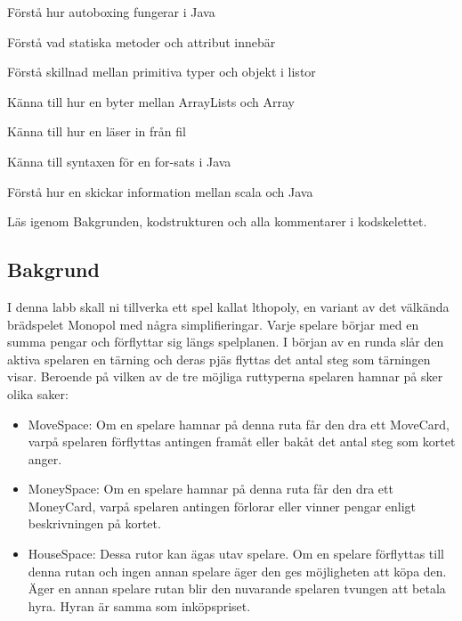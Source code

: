 

\Teamlab{\LabWeekTWELVE}

\begin{Goals}
\item Förstå hur autoboxing fungerar i Java
\item Förstå vad statiska metoder och attribut innebär
\item Förstå skillnad mellan primitiva typer och objekt i listor
\item Känna till hur en byter mellan ArrayLists och Array
\item Känna till hur en läser in från fil
\item Känna till syntaxen för en for-sats  i Java
\item Förstå hur en skickar information mellan scala och Java
\end{Goals}

\begin{Preparations}
\item {}
\item Läs igenom Bakgrunden, kodstrukturen och alla kommentarer i kodskelettet.

\end{Preparations}

\subsection{Bakgrund}
I denna labb skall ni tillverka ett spel kallat lthopoly, en variant av det välkända brädspelet Monopol med några simplifieringar. Varje spelare börjar med en summa pengar och förflyttar sig längs spelplanen.
I början av en runda slår den aktiva spelaren en tärning och deras pjäs flyttas det antal steg som tärningen visar. 
Beroende på vilken av de tre möjliga ruttyperna spelaren hamnar på sker olika saker:

\begin{itemize}
\item MoveSpace: Om en spelare hamnar på denna ruta får den dra ett MoveCard, varpå spelaren förflyttas antingen framåt eller bakåt det antal steg som kortet anger.
\item MoneySpace: Om en spelare hamnar på denna ruta får den dra ett MoneyCard, varpå spelaren antingen förlorar eller vinner pengar enligt beskrivningen på kortet.
\item HouseSpace: Dessa rutor kan ägas utav spelare. Om en spelare förflyttas till denna rutan och ingen annan spelare äger den ges möjligheten att köpa den. Äger en annan spelare rutan blir den nuvarande spelaren tvungen att betala hyra. Hyran är samma som inköpspriset.
\end{itemize}

